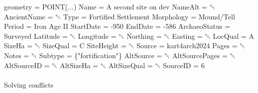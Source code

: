 \documentclass[
  letterpaper,
  DIV=11,
  numbers=noendperiod]{scrartcl}
\makeatletter
\let\oldparagraph\paragraph
\renewcommand{\paragraph}{
    \@ifstar
      \xxxParagraphStar
      \xxxParagraphNoStar
  }
\newcommand{\xxxParagraphStar}[1]{\oldparagraph*{#1}\mbox{}}
\newcommand{\xxxParagraphNoStar}[1]{\oldparagraph{#1}\mbox{}}
\newenvironment{Shaded}{\begin{snugshade}}{\end{snugshade}}
\newcommand{\AttributeTok}[1]{\textcolor[rgb]{1.00,0.47,0.78}{#1}}
\newcommand{\ErrorTok}[1]{\textcolor[rgb]{1.00,0.33,0.33}{\underline{#1}}}
\newcommand{\ExtensionTok}[1]{\textcolor[rgb]{0.55,0.91,0.99}{#1}}
\newcommand{\KeywordTok}[1]{\textcolor[rgb]{1.00,0.47,0.78}{#1}}
\newcommand{\NormalTok}[1]{\textcolor[rgb]{0.97,0.97,0.95}{#1}}
\newcommand{\StringTok}[1]{\textcolor[rgb]{0.95,0.98,0.55}{#1}}
\makeatother
\begin{document}
\begin{tcolorbox}
\begin{Shaded}
\begin{Highlighting}[]
                                \ExtensionTok{geometry}\NormalTok{ = POINT}\ErrorTok{(}\ExtensionTok{...}\KeywordTok{)}
                                    \ExtensionTok{Name}\NormalTok{ = A second site on dev}
                                 \ExtensionTok{NameAlt}\NormalTok{ = ␀}
                             \ExtensionTok{AncientName}\NormalTok{ = ␀}
                                    \ExtensionTok{Type}\NormalTok{ = Fortified Settlement}
                              \ExtensionTok{Morphology}\NormalTok{ = Mound/Tell}
                                  \ExtensionTok{Period}\NormalTok{ = Iron Age II}
                               \ExtensionTok{StartDate}\NormalTok{ = }\AttributeTok{{-}950}
                                 \ExtensionTok{EndDate}\NormalTok{ = }\AttributeTok{{-}586}
                           \ExtensionTok{ArchaeoStatus}\NormalTok{ = Surveyed}
                                \ExtensionTok{Latitude}\NormalTok{ = ␀}
                               \ExtensionTok{Longitude}\NormalTok{ = ␀}
                                \ExtensionTok{Northing}\NormalTok{ = ␀}
                                 \ExtensionTok{Easting}\NormalTok{ = ␀}
                                 \ExtensionTok{LocQual}\NormalTok{ = A}
                                  \ExtensionTok{SizeHa}\NormalTok{ = ␀}
                                \ExtensionTok{SizeQual}\NormalTok{ = C}
                              \ExtensionTok{SiteHeight}\NormalTok{ = ␀}
                                  \ExtensionTok{Source}\NormalTok{ = kart4arch2024}
                                   \ExtensionTok{Pages}\NormalTok{ = ␀}
                                   \ExtensionTok{Notes}\NormalTok{ = ␀}
                                 \ExtensionTok{Subtype}\NormalTok{ = \{}\StringTok{"fortification"}\NormalTok{\}}
                               \ExtensionTok{AltSource}\NormalTok{ = ␀}
                          \ExtensionTok{AltSourcePages}\NormalTok{ = ␀}
                             \ExtensionTok{AltSourceID}\NormalTok{ = ␀}
                               \ExtensionTok{AltSizeHa}\NormalTok{ = ␀}
                             \ExtensionTok{AltSizeQual}\NormalTok{ = ␀}
                                \ExtensionTok{SourceID}\NormalTok{ = 6}
\end{Highlighting}
\end{Shaded}

\end{tcolorbox}

\paragraph{Solving conflicts}\label{solving-conflicts}
\end{document}
